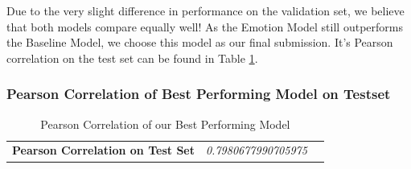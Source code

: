 \documentclass{article}
\begin{document}
Due to the very slight difference in performance on the validation set, we believe that both models compare equally well! As the Emotion Model still outperforms the Baseline Model, we choose this model as our final submission. It's Pearson correlation on the test set can be found in Table \ref{tab:final_acc}. 


\subsubsection{Pearson Correlation of Best Performing Model on Testset}


\begin{table}[h!]
    \centering
    \begin{tabular}{c|cc}
    \hline
    \textbf{Pearson Correlation on Test Set} & \textit{0.7980677990705975}
    \end{tabular}
\caption{Pearson Correlation of our Best Performing Model}
\label{tab:final_acc}
\end{table}
\end{document}
